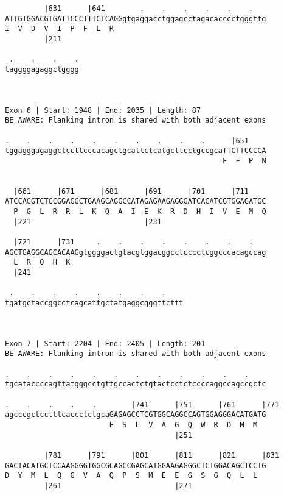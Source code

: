 \documentclass{article}
\begin{document}
\begin{Verbatim}
         |631      |641        .    .    .    .    .    .   
ATTGTGGACGTGATTCCCTTTCTCAGGgtgaggacctggagcctagacacccctgggttg
I  V  D  V  I  P  F  L  R                                   
         |211                                               
  
 .    .    .    .
taggggagaggctgggg
                 
                 
 
Exon 6 | Start: 1948 | End: 2035 | Length: 87
BE AWARE: Flanking intron is shared with both adjacent exons
 
.    .    .    .    .    .    .    .    .    .      |651    
tggagggagaggctccttcccacagctgcattctcatgcttcctgccgcaTTCTTCCCCA
                                                  F  F  P  N
                                                            
  
  |661      |671      |681      |691      |701      |711    
ATCCAGGTCTCCGGAGGCTGAAGCAGGCCATAGAGAAGAGGGATCACATCGTGGAGATGC
  P  G  L  R  R  L  K  Q  A  I  E  K  R  D  H  I  V  E  M  Q
  |221                          |231                        
  
  |721      |731     .    .    .    .    .    .    .    .   
AGCTGAGGCAGCACAAGgtggggactgtacgtggacggcctcccctcggcccacagccag
  L  R  Q  H  K                                             
  |241                                                      
  
 .    .    .    .    .    .    .    .    
tgatgctaccggcctcagcattgctatgaggcgggttcttt
                                         
                                         
 
Exon 7 | Start: 2204 | End: 2405 | Length: 201
BE AWARE: Flanking intron is shared with both adjacent exons
 
.    .    .    .    .    .    .    .    .    .    .    .    
tgcataccccagttatgggcctgttgccactctgtactcctctccccaggccagccgctc
                                                            
.    .    .    .    .        |741      |751      |761      |771
agcccgctcctttcaccctctgcaGAGAGCCTCGTGGCAGGCCAGTGGAGGGACATGATG
                        E  S  L  V  A  G  Q  W  R  D  M  M  
                                       |251                 
  
         |781      |791      |801      |811      |821      |831
GACTACATGCTCCAAGGGGTGGCGCAGCCGAGCATGGAAGAGGGCTCTGGACAGCTCCTG
D  Y  M  L  Q  G  V  A  Q  P  S  M  E  E  G  S  G  Q  L  L  
         |261                          |271                 
  

\end{Verbatim}
\end{document}
